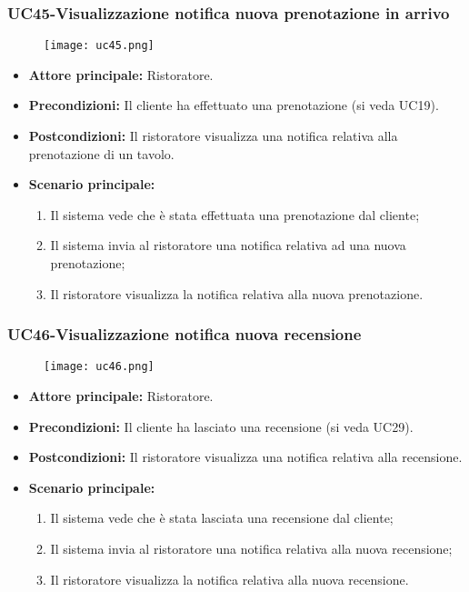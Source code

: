 \pagebreak
\subsubsection{UC45-Visualizzazione notifica nuova prenotazione in arrivo}
\begin{figure}[h] \texttt{[image: uc45.png]} \end{figure}
\begin{itemize}
\item \textbf{Attore principale:} Ristoratore.
\item \textbf{Precondizioni:} Il cliente ha effettuato una prenotazione (si veda UC19).
\item \textbf{Postcondizioni:} Il ristoratore visualizza una notifica relativa alla prenotazione di un tavolo.
\item \textbf{Scenario principale:}
\begin{enumerate}
    \item Il sistema vede che è stata effettuata una prenotazione dal cliente;
    \item Il sistema invia al ristoratore una notifica relativa ad una nuova prenotazione;
    \item Il ristoratore visualizza la notifica relativa alla nuova prenotazione.
\end{enumerate}
\end{itemize}

\subsubsection{UC46-Visualizzazione notifica nuova recensione}
\begin{figure}[h] \texttt{[image: uc46.png]} \end{figure}
\begin{itemize}
\item \textbf{Attore principale:} Ristoratore.
\item \textbf{Precondizioni:} Il cliente ha lasciato una recensione (si veda UC29).
\item \textbf{Postcondizioni:} Il ristoratore visualizza una notifica relativa alla recensione.
\item \textbf{Scenario principale:}
\begin{enumerate}
    \item Il sistema vede che è stata lasciata una recensione dal cliente;
    \item Il sistema invia al ristoratore una notifica relativa alla nuova recensione;
    \item Il ristoratore visualizza la notifica relativa alla nuova recensione.
\end{enumerate}
\end{itemize}


